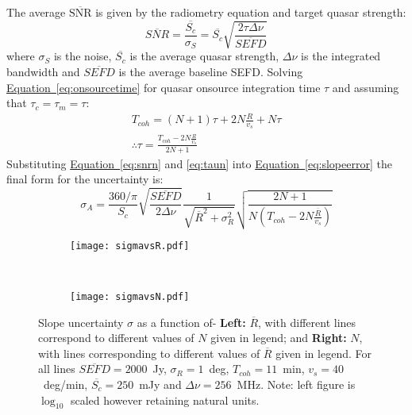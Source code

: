 		The average $\overline{\text{SNR}}$ is given by the radiometry equation and target quasar strength:
		\begin{equation}
		\overline{SNR} = \frac{\overline{S_c}}{\sigma_S} = \overline{S_c}\sqrt{\frac{2\tau\Delta\nu}{\overline{SEFD}}}
		\label{eq:snrn}
		\end{equation} where $\sigma_S$ is the noise, $\overline{S_c}$ is the average quasar strength, $\Delta\nu$ is the integrated bandwidth and $\overline{SEFD}$ is the average baseline SEFD. Solving \hyperref[eq:onsourcetime]{Equation~\ref*{eq:onsourcetime}} for quasar onsource integration time $\tau$ and assuming that $\tau_c = \tau_m = \tau$:
		\begin{equation}
		\begin{split}
		T_{coh}  = \left(N + 1\right)\tau + 2N\frac{R}{v_s} + N\tau \\
		\therefore \tau = \frac{T_{coh} - 2N\frac{R}{v_s}}{2N + 1}
		\end{split}
		\label{eq:taun}
		\end{equation}
		Substituting \hyperref[eq:snrn]{Equation~\ref*{eq:snrn}} and \hyperref[eq:taun]{\ref*{eq:taun}} into \hyperref[eq:slopeerror]{Equation~\ref*{eq:slopeerror}} the final form for the uncertainty is:
		\begin{equation}
		\sigma_{A} =  \frac{360/\pi}{S_c}\sqrt{\frac{\overline{SEFD}}{2\Delta\nu}}\frac{1}{\sqrt{\overline{R}^2+\sigma_R^2}}\sqrt{\frac{2N+1}{N\left(T_{coh}-2N\frac{\overline{R}}{v_s}\right)}} 
		\label{eq:finalslopeerror}
		\end{equation}		
		
		\begin{figure}[h]
			\centering
			\begin{subfigure}[t]{0.45\textwidth}
				\centering
				\texttt{[image: sigmavsR.pdf]}
			\end{subfigure}
			~
			\begin{subfigure}[t]{0.45\textwidth}
				\centering
				\texttt{[image: sigmavsN.pdf]}
			\end{subfigure}
			\caption[Random Slope Uncertainty vs. Metrics]{Slope uncertainty $\sigma$ as a function of-  \textbf{Left:}  $\overline{R}$, with different lines correspond to different values of $N$ given in legend; and \textbf{Right:} $N$, with lines corresponding to different values of $\overline{R}$ given in legend. For all lines $\overline{SEFD}=2000$~Jy, $\sigma_R=1$~deg, $T_{coh}=11$~min, $v_s=40$~deg/min, $\overline{S_c}=250$~mJy and $\Delta\nu=256$~MHz. Note: left figure is $\log_{10}$ scaled however retaining natural units.} \label{fig:finalslopeerror}
		\end{figure}
		
